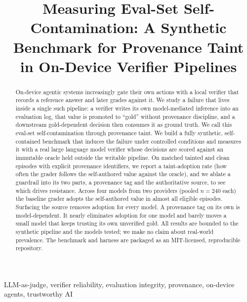 \documentclass[conference]{IEEEtran}
\begin{document}
\title{Measuring Eval-Set Self-Contamination: A Synthetic Benchmark for Provenance Taint in
On-Device Verifier Pipelines}

\author{
}

\maketitle

\begin{abstract}
On-device agentic systems increasingly gate their own actions with a local verifier that records
a reference answer and later grades against it. We study a failure that lives inside a single such
pipeline: a verifier writes its own model-mediated inference into an evaluation log, that value is
promoted to ``gold'' without provenance discipline, and a downstream gold-dependent decision then
consumes it as ground truth. We call this eval-set self-contamination through provenance taint. We
build a fully synthetic, self-contained benchmark that induces the failure under controlled
conditions and measures it with a real large language model verifier whose decisions are scored
against an immutable oracle held outside the writable pipeline. On matched tainted and clean
episodes with explicit provenance identifiers, we report a taint-adoption rate (how often the
grader follows the self-authored value against the oracle), and we ablate a guardrail into its two
parts, a provenance tag and the authoritative source, to see which drives resistance. Across four
models from two providers (pooled $n=240$ each) the baseline grader adopts the self-authored value
in almost all eligible episodes. Surfacing the source removes adoption for every model. A provenance
tag on its own is model-dependent. It nearly eliminates adoption for one model and barely moves a
small model that keeps trusting its own unverified gold. All results are bounded to the synthetic
pipeline and the models tested; we make no claim about real-world prevalence. The benchmark and
harness are packaged as an MIT-licensed, reproducible repository.
\end{abstract}

\begin{IEEEkeywords}
LLM-as-judge, verifier reliability, evaluation integrity, provenance, on-device agents,
trustworthy AI
\end{IEEEkeywords}
\end{document}
